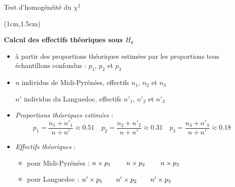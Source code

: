 \documentclass{beamer}
\begin{document}
\begin{frame}{Test d'homogénéité du $\chi^2$}
\begin{textblock*}{\textwidth}(1cm,1.5cm)

\begin{center}{\bf \Large Calcul des effectifs théoriques sous $H_0$} \end{center}

\begin{itemize}

\item à partir des proportions théoriques estimées par les proportions tous échantillons confondus : $p_1$, $p_2$ et $p_3$ \\
 
\item $n$ individus de Midi-Pyrénées, effectifs $n_1$, $n_2$ et $n_3$ 

$n'$ individus du Languedoc, effectifs  $n'_1$, $n'_2$ et $n'_3$ 

\item {\it Proportions théoriques estimées} : 
$$ p_1 = \frac{n_1+n'_1}{n+n'}\approx 0.51 \quad p_2 = \frac{n_2+n'_2}{n+n'}\approx 0.31 \quad
p_3 = \frac{n_3+n'_3}{n+n'}\approx 0.18
$$

\item {\it Effectifs théoriques} :
\begin{itemize}
\item pour Midi-Pyrénées : $ n \times p_1 \hspace{0.8cm} n \times p_2 \hspace{0.8cm} n \times p_3 \;\;$
\item pour Languedoc : \hspace{0.3cm} $ n' \times p_1 \hspace{0.7cm}  n' \times p_2 \hspace{0.7cm}  n' \times p_3 \;\;$
\end{itemize}
\end{itemize}
\end{textblock*}

\end{frame}

\end{document}
